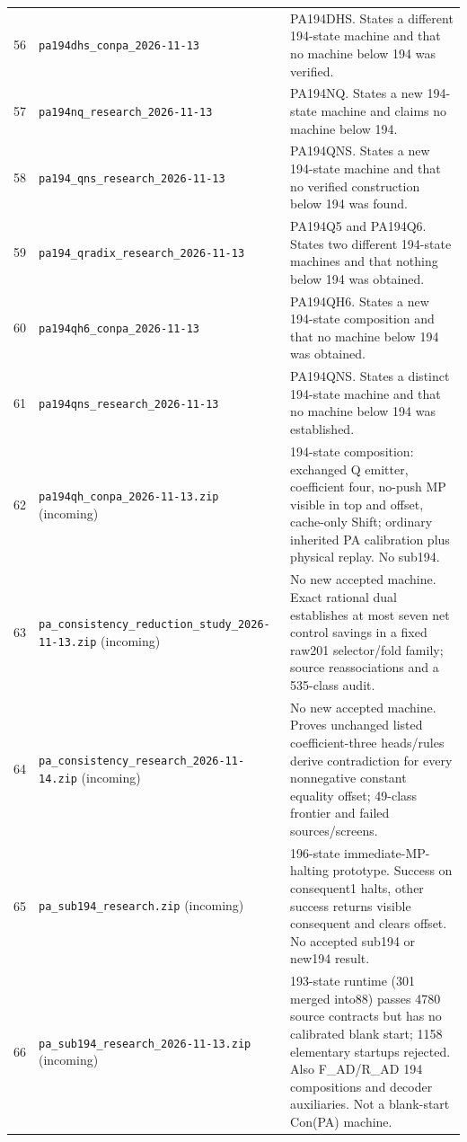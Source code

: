 \begin{longtable}{@{}rp{}p{}@{}}
56 & \nolinkurl{pa194dhs_conpa_2026-11-13} & PA194DHS. States a different 194-state machine and that no machine below 194 was verified.\\[5pt]
57 & \nolinkurl{pa194nq_research_2026-11-13} & PA194NQ. States a new 194-state machine and claims no machine below 194.\\[5pt]
58 & \nolinkurl{pa194_qns_research_2026-11-13} & PA194QNS. States a new 194-state machine and that no verified construction below 194 was found.\\[5pt]
59 & \nolinkurl{pa194_qradix_research_2026-11-13} & PA194Q5 and PA194Q6. States two different 194-state machines and that nothing below 194 was obtained.\\[5pt]
60 & \nolinkurl{pa194qh6_conpa_2026-11-13} & PA194QH6. States a new 194-state composition and that no machine below 194 was obtained.\\[5pt]
61 & \nolinkurl{pa194qns_research_2026-11-13} & PA194QNS. States a distinct 194-state machine and that no machine below 194 was established.\\[5pt]
62 & \nolinkurl{pa194qh_conpa_2026-11-13.zip} (incoming) & 194-state composition: exchanged Q emitter, coefficient four, no-push MP visible in top and offset, cache-only Shift; ordinary inherited PA calibration plus physical replay. No sub194.\\[5pt]
63 & \nolinkurl{pa_consistency_reduction_study_2026-11-13.zip} (incoming) & No new accepted machine. Exact rational dual establishes at most seven net control savings in a fixed raw201 selector/fold family; source reassociations and a 535-class audit.\\[5pt]
64 & \nolinkurl{pa_consistency_research_2026-11-14.zip} (incoming) & No new accepted machine. Proves unchanged listed coefficient-three heads/rules derive contradiction for every nonnegative constant equality offset; 49-class frontier and failed sources/screens.\\[5pt]
65 & \nolinkurl{pa_sub194_research.zip} (incoming) & 196-state immediate-MP-halting prototype. Success on consequent1 halts, other success returns visible consequent and clears offset. No accepted sub194 or new194 result.\\[5pt]
66 & \nolinkurl{pa_sub194_research_2026-11-13.zip} (incoming) & 193-state runtime (301 merged into88) passes 4780 source contracts but has no calibrated blank start; 1158 elementary startups rejected. Also F\_AD/R\_AD 194 compositions and decoder auxiliaries. Not a blank-start Con(PA) machine.\\[5pt]
\bottomrule\end{longtable}\endgroup
